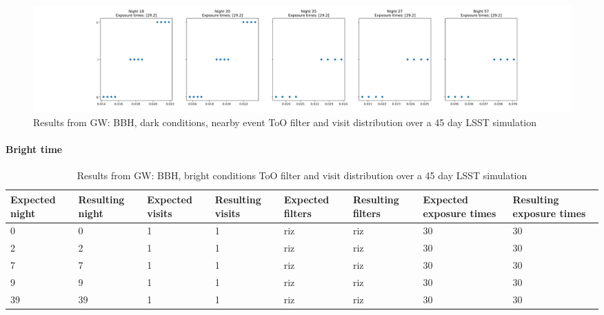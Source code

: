 \begin{figure}
    \centering
    \includegraphics[width=\linewidth]{figures/validationTests/SVRequired/BBHDarkNearFilterPlot.png}
    \caption{Results from GW: BBH, dark conditions, nearby event ToO filter and visit distribution over a 45 day LSST simulation}
    \label{fig:GWDarkNearFilterResult}
\end{figure}
\newpage
\paragraph{Bright time}

\begin{table}[]
\centering
\begin{adjustbox}{max width=\textwidth}
\begin{tabular}{|l|l|l|l|l|l|l|l|}
\hline
Expected night & Resulting night & Expected visits & Resulting visits & Expected filters & Resulting filters & Expected exposure times & Resulting exposure times \\ \hline
0              & 0               & 1               & 1                & riz              & riz               & 30                      & 30                       \\ \hline
2              & 2               & 1               & 1                & riz              & riz               & 30                      & 30                       \\ \hline
7              & 7               & 1               & 1                & riz              & riz               & 30                      & 30                       \\ \hline
9              & 9               & 1               & 1                & riz              & riz               & 30                      & 30                       \\ \hline
39             & 39              & 1               & 1                & riz              & riz               & 30                      & 30                       \\ \hline
\end{tabular}
\end{adjustbox}
\caption{Results from GW: BBH, bright conditions ToO filter and visit distribution over a 45 day LSST simulation}
\label{tab:BBHBrightResults}
\end{table}



